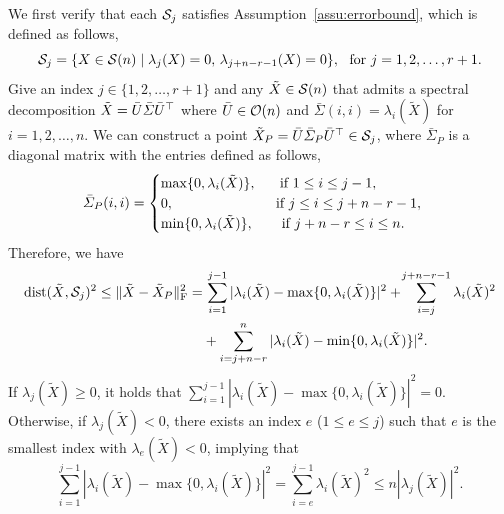 \smallskip

We first verify that each $\mathcal{S}_j$ satisfies Assumption~\ref{assu:errorbound}, which is defined as follows,
\begin{equation}\label{eq:characterize_Sj}
 \sanifold_j=\{X\in\sym(n)\mid\lambda_{j}(X)=0,\,\lambda_{j+n-r-1}(X)=0\},\ \ \text{for}\ j=1,2,\ldots,r+1.
\end{equation}
Give an index $j\in\{1,2,\ldots, r+1\}$ and any $\tilde{X} \in \mathcal{S}(n)$ that admits a spectral decomposition $\tilde{X}=\bar{U} \bar{\varSigma}\bar{U}^\top$ where $\bar{U}\in\mathcal{O}(n)$ and $\bar{\varSigma}(i,i)=\lambda_i(\tilde{X})$ for $i=1,2,\ldots,n$. We can construct a point $\tilde{X}_P=\bar{U}\bar{\varSigma}_P\bar{U}^\top\in\mathcal{S}_j$, 
where $\bar{\varSigma}_P$ is a diagonal matrix with the entries defined as follows,
\begin{equation}\label{eq:proj_Sj}
    \bar{\varSigma}_P(i,i) = \begin{cases}
    \max\{0,\lambda_i(\tilde{X})\},\  \ \ \ \ \text{if}\ 1\le i \le j-1,
	\\
    0, \hspace{24.5mm}\ \text{if}\ j\le i \le j+n-r-1,
    \\
    \min\{0,\lambda_i(\tilde{X})\},\  \ \ \ \ \ \text{if}\ j+n-r\le i \le n.
\end{cases}
\end{equation}
Therefore, we have
\begin{equation}\label{eq:disttosr}
    \begin{aligned}
    \!\!\!\dist(\tilde{X},\sanifold_j)^2 \le \|\tilde{X}-\tilde{X}_P\|_\frob^2 =&\!\ \sum_{i=1}^{j-1} |\lambda_i(\tilde{X})-\max\{0,\lambda_i(\tilde{X})\}|^2 + \!\sum_{i=j}^{j+n-r-1}\lambda_i(\tilde{X})^2\!\!\!
    \\
    &+\sum_{i=j+n-r}^n |\lambda_i(\tilde{X})-\min\{0,\lambda_i(\tilde{X})\}|^2.
    \end{aligned}
\end{equation}
If $\lambda_{j}(\tilde{X})\ge 0$, it holds that $\sum_{i=1}^{j-1} |\lambda_i(\tilde{X})-\max\{0,\lambda_i(\tilde{X})\}|^2 = 0$. Otherwise, if $\lambda_{j}(\tilde{X}) < 0$, there exists an index $e$ ($1 \le e \le j$) such that $e$ is the smallest index with $\lambda_e(\tilde{X}) < 0$, implying that
\begin{equation}\label{eq:case2}
   \sum_{i=1}^{j-1} |\lambda_i(\tilde{X})-\max\{0,\lambda_i(\tilde{X})\}|^2= \sum_{i=e}^{j-1}\lambda_i(\tilde{X})^2\le n|\lambda_{j}(\tilde{X})|^2.
\end{equation}
